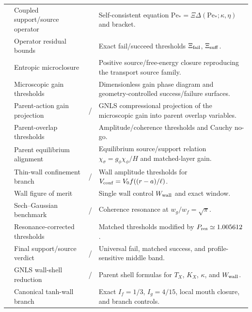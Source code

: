\begin{longtable}{@{}L{0.09\textwidth}L{0.30\textwidth}L{0.20\textwidth}L{0.35\textwidth}@{}}
 & Coupled support/source operator & \StatusExactClosure{} & Self-consistent equation \(\mathrm{Pe}_*=\Xi\Delta(\mathrm{Pe}_*;\kappa,\eta)\) and bracket. \\
 & Operator residual bounds & \StatusExactClosure{} & Exact fail/succeed thresholds \(\Xi_{\rm fail}\), \(\Xi_{\rm suff}\). \\
 & Entropic microclosure & \StatusExactClosure{} & Positive source/free-energy closure reproducing the transport source family. \\
 & Microscopic gain thresholds & \StatusExactClosure{} & Dimensionless gain phase diagram and geometry-controlled success/failure surfaces. \\
 & Parent-action gain projection & \StatusExact{} / \StatusReduced{} & GNLS compressional projection of the microscopic gain into parent overlap variables. \\
 & Parent-overlap thresholds & \StatusExactClosure{} & Amplitude/coherence thresholds and Cauchy no-go. \\
 & Parent equilibrium alignment & \StatusExactClosure{} & Equilibrium source/support relation \(\chi_\sigma=g_\phi\chi_\phi/H\) and matched-layer gain. \\
 & Thin-wall confinement branch & \StatusExactClosure{} / \StatusReduced{} & Wall amplitude thresholds for \(V_{\rm conf}=V_0f((r-a)/\ell)\). \\
 & Wall figure of merit & \StatusExactClosure{} & Single wall control \(W_{\rm wall}\) and exact window. \\
 & Sech--Gaussian benchmark & \StatusExactClosure{} / \StatusNumerical{} & Coherence resonance at \(w_g/w_f=\sqrt\pi\). \\
 & Resonance-corrected thresholds & \StatusExactClosure{} & Matched thresholds modified by \(P_{\rm res}\simeq1.005612\). \\
 & Final support/source verdict & \StatusExactClosure{} / \StatusOpen{} & Universal fail, matched success, and profile-sensitive middle band. \\
 & GNLS wall-shell reduction & \StatusExactClosure{} / \StatusReduced{} & Parent shell formulas for \(T_X\), \(K_X\), \(\kappa\), and \(W_{\rm wall}\). \\
 & Canonical tanh-wall branch & \StatusExactClosure{} & Exact \(I_f=1/3\), \(I_g=4/15\), local mouth closure, and branch controls. \\

\end{longtable}

